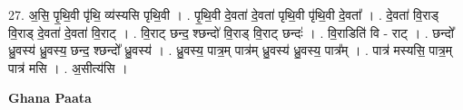 \documentclass[17pt]{extarticle}
\begin{document}
27. अ॒सि॒ पृ॒थि॒वी पृ॑थि॒ व्य॑स्यसि पृथि॒वी । . पृ॒थि॒वी दे॒वता॑ दे॒वता॑ पृथि॒वी पृ॑थि॒वी दे॒वता᳚ । . दे॒वता॑ वि॒राड् वि॒राड् दे॒वता॑ दे॒वता॑ वि॒राट् । . वि॒राट् छन्द॒ श्छन्दो॑ वि॒राड् वि॒राट् छन्दः॑ । . वि॒राडिति॑ वि - राट् । . छन्दो᳚ ध्रु॒वस्य॑ ध्रु॒वस्य॒ छन्द॒ श्छन्दो᳚ ध्रु॒वस्य॑ । . ध्रु॒वस्य॒ पात्र॒म् पात्र॑म् ध्रु॒वस्य॑ ध्रु॒वस्य॒ पात्र᳚म् । . पात्र॑ मस्यसि॒ पात्र॒म् पात्र॑ मसि । . अ॒सीत्य॑सि । \newline

\textbf{Ghana Paata } \newline
\end{document}
